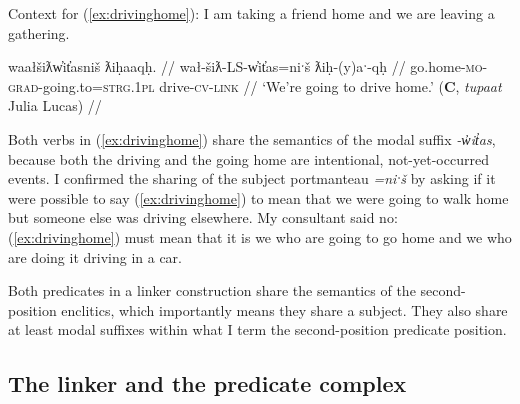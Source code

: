 \vspace{5pt}

\noindent Context for (\ref{ex:drivinghome}): I am taking a friend home and we are leaving a gathering.

\ex \label{ex:drivinghome}
\begingl
\glpreamble waałšiƛw̓it̓asniš ƛiḥaaqḥ. //
\gla wał-šiƛ-LS-w̓it̓as=niˑš ƛiḥ-(y)aˑ-qḥ //
\glb go.home-\textsc{mo}-\textsc{grad}-going.to=\textsc{strg.1pl} drive-\textsc{cv}-\textsc{link} //
\glft `We're going to drive home.' (\textbf{C}, \textit{tupaat} Julia Lucas) //
\endgl
\xe

Both verbs in (\ref{ex:drivinghome}) share the semantics of the modal suffix \textit{-w̓it̓as}, because both the driving and the going home are intentional, not-yet-occurred events. I confirmed the sharing of the subject portmanteau \textit{=niˑš} by asking if it were possible to say (\ref{ex:drivinghome}) to mean that we were going to walk home but someone else was driving elsewhere. My consultant said no: (\ref{ex:drivinghome}) must mean that it is we who are going to go home and we who are doing it driving in a car.

Both predicates in a linker construction share the semantics of the second-position enclitics, which importantly means they share a subject. They also share at least modal suffixes within what I term the second-position predicate position.


\begin{comment}
\ex \label{ex:someonespoke}
\begingl
\glpreamble ʔuušqḥʔaƛ ciqšiƛ.//
\gla ʔuuš-qḥ=ʔaƛ ciq-šiƛ //
\glb some-\textsc{link}=\textsc{now} speak-\textsc{mo} //
\glft `Someone spoke.' //
\endgl
\xe

\ex~ \label{ex:*someonespoke}
\begingl
\glpreamble *ʔuušqḥʔaƛ ciqšiƛḥ.//
\gla *ʔuuš-(q)ḥ=ʔaƛ ciq-šiƛ-(q)ḥ //
\glb *some-\textsc{link}=\textsc{now} speak-\textsc{mo}-\textsc{link} //
\glft Intended: `Someone spoke.' //
\endgl
\xe
\end{comment}


\subsection{The linker and the predicate complex} \label{ch:link:2p}

